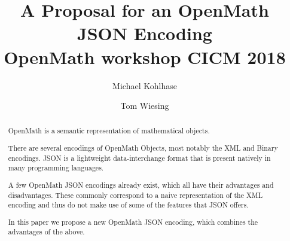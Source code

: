 \documentclass[12pt]{article}
\title{A Proposal for an OpenMath JSON Encoding\\OpenMath workshop CICM 2018}
\author{Michael Kohlhase \and Tom Wiesing}
\begin{document}
    \maketitle

    \begin{abstract}
        OpenMath is a semantic representation of mathematical objects. 

        There are several encodings of OpenMath Objects, most notably the XML and Binary encodings. 
        JSON is a lightweight data-interchange format that is present natively in many programming languages. 
        
        A few OpenMath JSON encodings already exist, which all have their advantages and disadvantages. 
        These commonly correspond to a naive representation of the XML encoding and thus do not make use of some of the features that JSON offers. 
        
        In this paper we propose a new OpenMath JSON encoding, which combines the advantages of the above. 
    \end{abstract}

    
    \newpage
    \tableofcontents
    \newpage

    
    
    

    \printbibliography
\end{document}
